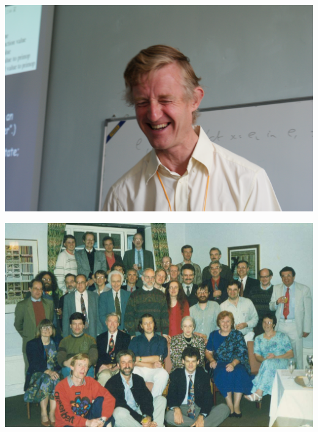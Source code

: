 \documentclass[17pt]{beamer}
\begin{document}
\begin{frame}
\hspace*{-11.2mm}
\includegraphics[width=\paperwidth]{spj}
\end{frame}

\begin{frame}
\hspace*{-11.2mm}
\includegraphics[width=\paperwidth]{haskellcomittee}
\end{frame}
\end{document}
